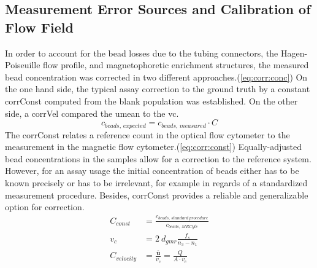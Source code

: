 \clearpage
\subsection{Measurement Error Sources and Calibration of Flow Field}
\label{sec:res:Correction}
In order to account for the bead losses due to the tubing connectors, the Hagen-Poiseuille flow profile, and magnetophoretic enrichment structures, the measured bead concentration was corrected in two different approaches.(\cref{eq:corr:conc}) On the one hand side, the typical assay correction to the ground truth by a constant \gls{corrConst} computed from the blank population was established. On the other side, a \gls{corrVel} compared the \acrfull{umean} to the \gls{vc}.
\begin{equation}	
	c_{beads,\, expected} = c_{beads,\, measured}  \cdot C \label{eq:corr:conc}
\end{equation}
The \gls{corrConst} relates a reference count in the optical flow cytometer to the measurement in the magnetic flow cytometer.(\cref{eq:corr:const}) Equally-adjusted bead concentrations in the samples allow for a correction to the reference system. However, for an assay usage the initial concentration of beads either has to be known precisely or has to be irrelevant, for example in regards of a standardized measurement procedure. Besides, \gls{corrConst} provides a reliable and generalizable option for correction. 
\begin{align}
	C_{const} &= \frac{c_{beads,\, standard\ procedure}}{c_{beads,\, MRCyte}} \label{eq:corr:const}\\
	v_c &= 2\ d_{gmr} \frac{f_s}{n_3-n_1} \label{eq:v:c} \\
	C_{velocity} &= \frac{\overline{\mathbf{u}}}{v_c} = \frac{Q}{A \cdot v_c} \label{eq:corr:vel} 
\end{align}
